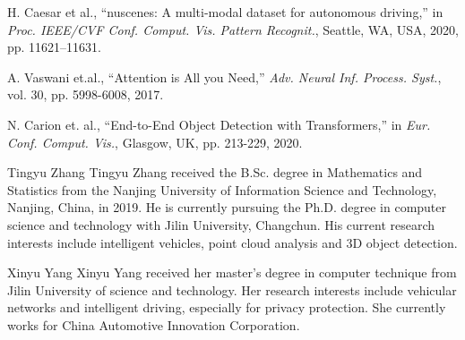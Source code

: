 \documentclass[journal]{IEEEtran}
\begin{document}
\begin{thebibliography}{1}
		H. Caesar et al., “nuscenes: A multi-modal dataset for autonomous driving,” in \textit{Proc. IEEE/CVF Conf. Comput. Vis. Pattern Recognit.}, Seattle, WA, USA, 2020, pp. 11621–11631.
		
		{A. Vaswani et.al., “Attention is All you Need,” \textit{Adv. Neural Inf. Process. Syst.}, vol. 30, pp. 5998-6008, 2017.}
		
		{N. Carion et. al., “End-to-End Object Detection with Transformers,” in \textit{Eur. Conf. Comput. Vis.}, Glasgow, UK, pp. 213-229, 2020.}
		
		
		
		
	\end{thebibliography}
	
	
	
	\begin{IEEEbiography}{Tingyu Zhang}
		Tingyu Zhang received the B.Sc. degree in Mathematics and Statistics from the Nanjing University of Information Science and Technology, Nanjing, China,
		in 2019. He is currently pursuing the Ph.D. degree
		in computer science and technology with Jilin University,
		Changchun. His current research interests
		include intelligent vehicles, point cloud analysis and 3D object detection.\end{IEEEbiography}
	\begin{IEEEbiography}{Xinyu Yang}
		Xinyu Yang received her master's degree in computer technique from Jilin University of science and technology. Her research interests include vehicular networks and intelligent driving, especially for privacy protection. She currently works for China Automotive Innovation Corporation.\end{IEEEbiography}
	
\end{document}
